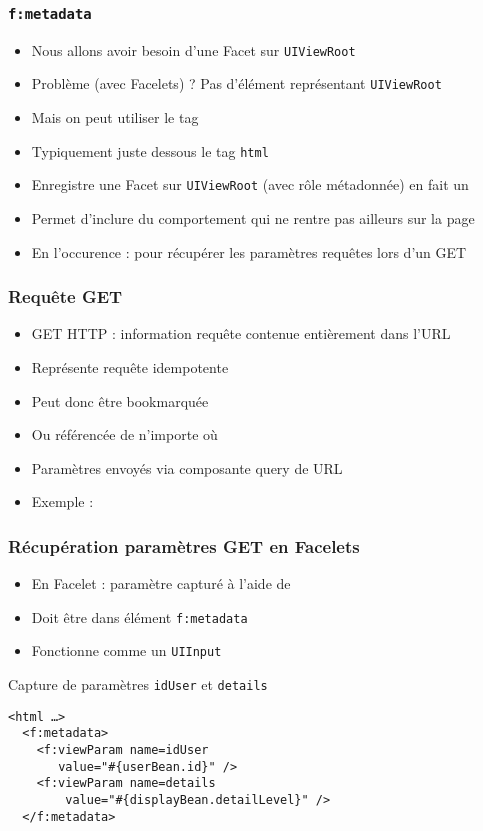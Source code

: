 \documentclass[english, french]{beamer}
\begin{document}
\begin{frame}
	\frametitle{\texttt{f:metadata}}
	\begin{itemize}
		\item Nous allons avoir besoin d’une Facet sur \texttt{UIViewRoot}
		\item Problème (avec Facelets) ? \pause Pas d’élément représentant \texttt{UIViewRoot} \pause
		\item Mais on peut utiliser le tag 
		\item {\tiny Typiquement} juste dessous le tag \texttt{html}
		\item Enregistre une Facet sur \texttt{UIViewRoot} (avec rôle métadonnée) {\tiny en fait un }
		\item Permet d’inclure du comportement qui ne rentre pas ailleurs sur la page
		\item En l’occurence : pour récupérer les paramètres requêtes lors d’un GET
	\end{itemize}
\end{frame}

\begin{frame}
	\frametitle{Requête GET}
	\begin{itemize}
		\item GET HTTP : information requête contenue entièrement dans l’URL
		\item Représente requête idempotente
		\item Peut donc être \og{}bookmarquée\fg{}
		\item Ou référencée de n’importe où
		\item Paramètres envoyés via composante \og{}query\fg{} de URL
		\item Exemple : 
	\end{itemize}
\end{frame}

\begin{frame}[fragile]
	\frametitle{Récupération paramètres GET en Facelets}
	\begin{itemize}
		\item En Facelet : paramètre capturé à l’aide de 
		\item Doit être dans élément \texttt{f:metadata}
		\item Fonctionne comme un \texttt{UIInput}
	\end{itemize}
	\begin{exampleblock}{Capture de paramètres \texttt{idUser} et \texttt{details}}
		\begin{lstlisting}
<html …>
  <f:metadata>
    <f:viewParam name=idUser
       value="#{userBean.id}" />
    <f:viewParam name=details
        value="#{displayBean.detailLevel}" />
  </f:metadata>
		\end{lstlisting}
	\end{exampleblock}
\end{frame}
\end{document}
